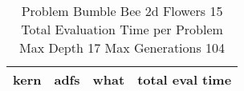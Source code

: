 \begin{table}[H]
\caption{Problem  Bumble Bee 2d  Flowers 15\\Total Evaluation Time per Problem \\ Max Depth 17 Max Generations 104\\}
\begin{center}
\scalebox{1.0} %
{
\begin{tabular}{lllr}
\hline
kern & adfs & what & total eval time \\
\hline


\end{tabular}
}
\end{center}
\end{table}

